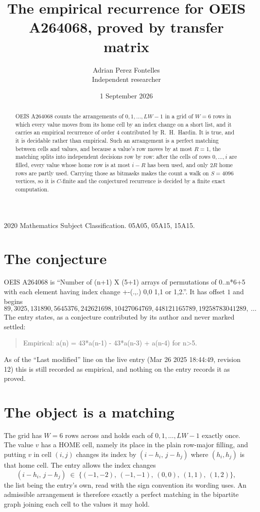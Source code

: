 \documentclass[11pt,a4paper]{article}
\title{The empirical recurrence for OEIS A264068, proved by transfer matrix}
\author{Adrian Perez Fontelles\\ \small Independent researcher}
\date{1 September 2026}
\theoremstyle{plain}
\theoremstyle{definition}
\begin{document}
\maketitle

\begin{abstract}
OEIS A264068 counts the arrangements of $0,1,\dots,LW-1$ in a grid of $W=6$ rows in which
every value moves from its home cell by an index change on a short list, and it carries an
empirical recurrence of order $4$ contributed by R.~H.~Hardin. It is true, and it is
decidable rather than empirical. Such an arrangement is a perfect matching between cells and
values, and because a value's row moves by at most $R=1$, the matching splits into
independent decisions row by row: after the cells of rows $0,\dots,i$ are filled,
every value whose home row is at most $i-R$ has been used, and only $2R$ home rows are
partly used. Carrying those as bitmasks makes the count a walk on $S=4096$ vertices, so it is
$C$-finite and the conjectured recurrence is decided by a finite exact computation.
\end{abstract}

\noindent\small 2020 Mathematics Subject Classification. 05A05, 05A15, 15A15.\normalsize

\section{The conjecture}

OEIS A264068 is ``Number of (n+1) X (5+1) arrays of permutations of 0..n*6+5 with each element having index change +-(.,.) 0,0 1,1 or 1,2.''. It has offset $1$ and begins
\[
89, 3025, 131890, 5645376, 242621698, 10427064769, 448121165789, 19258783041289,\ \dots
\]
The entry states, as a conjecture contributed by its author and never marked settled:
\begin{quote}
Empirical: a(n) = 43*a(n-1) - 43*a(n-3) + a(n-4) for n>5.
\end{quote}
As of the ``Last modified'' line on the live entry (Mar 26 2025 18:44:49, revision 12) this is still
recorded as empirical, and nothing on the entry records it as proved.

\section{The object is a matching}

The grid has $W=6$ rows across and holds each of $0,1,\dots,LW-1$ exactly once. The value
$v$ has a HOME cell, namely its place in the plain row-major filling, and putting $v$ in cell
$(i,j)$ changes its index by $(i-h_i,\,j-h_j)$ where $(h_i,h_j)$ is that home cell. The entry
allows the index changes
\[
(i-h_i,\,j-h_j)\;\in\;\{(-1,-2),\ (-1,-1),\ (0,0),\ (1,1),\ (1,2)\},
\]
the list being the entry's own, read with the sign convention its wording uses. An admissible
arrangement is therefore exactly a perfect matching in the bipartite graph joining each cell to
the values it may hold.
\end{document}
